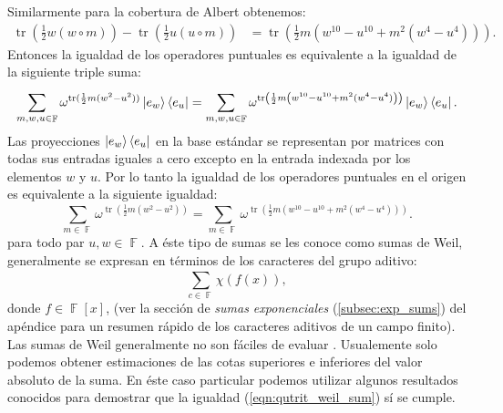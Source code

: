 \documentclass[a4paper]{report}
\DeclareMathOperator{\F}{\mathbb{F}}
\DeclareMathOperator{\tr}{tr}
\begin{document}
  Similarmente para la cobertura de Albert obtenemos:
  \begin{align}
    \tr\left(\frac{1}{2} w(w\circ m)\right)
    - \tr\left(\frac{1}{2} u(u\circ m)\right)
    &= \tr\left( 
      \frac{1}{2} m \left( w^{10} - u^{10}  
      + m^2 \left( w^{4} - u^{4}\right) \right)
    \right). 
  \end{align}
  Entonces la igualdad de los operadores puntuales es
  equivalente a la igualdad de la siguiente triple suma:
  \begin{equation}
    \sum_{m,w,u \in \F}^{}
    \omega^{\tr(\frac{1}{2} m(w^2-u^2))}
    \ket{e_w}\bra{e_u}
    = 
    \sum_{m,w,u \in \F}^{}
    \omega^{\tr\left(\frac{1}{2} m
    \left(w^{10}-u^{10} +  m^2(w^{4}-u^{4})\right) \right)
    }
    \ket{e_w}\bra{e_u}.
  \end{equation}
  Las proyecciones $\ket{e_w}\bra{e_u}$ en la base
  estándar se representan por matrices con todas sus
  entradas iguales a cero excepto en la entrada indexada por
  los elementos $w$ y $u$. Por lo tanto la igualdad de los
  operadores puntuales en el origen es equivalente a la
  siguiente igualdad:
  \begin{equation}
    \label{eqn:qutrit_weil_sum}
    \sum_{m \in \F}^{}
    \omega^{\tr\left( 
        \frac{1}{2} m \left( w^2 - u^2 \right) 
    \right) }
    =
    \sum_{m \in \F}^{} 
    \omega^{\tr\left( 
        \frac{1}{2} m\left( w^{10}-u^{10} + m^2(w^{4}-u^{4})
        \right) 
    \right) }.
  \end{equation}
  para todo par $u,w \in \F$. A éste tipo de sumas se les
  conoce como sumas de Weil, generalmente se expresan en
  términos de los caracteres del grupo aditivo:
  \begin{equation}
    \sum_{c \in \F}^{} \chi(f(x)),
  \end{equation}
  donde $f \in \F[x]$, (ver la sección de \textit{sumas
  exponenciales} (\ref{subsec:exp_sums}) del apéndice para
  un resumen rápido de los caracteres aditivos de un campo
  finito). Las sumas de Weil generalmente no son fáciles de
  evaluar \cite{lidl1994}.  Usualemente solo podemos obtener
  estimaciones de las cotas superiores e inferiores del
  valor absoluto de la suma. En éste caso particular podemos
  utilizar algunos resultados conocidos para demostrar que
  la igualdad (\ref{eqn:qutrit_weil_sum}) sí se cumple.
\end{document}
